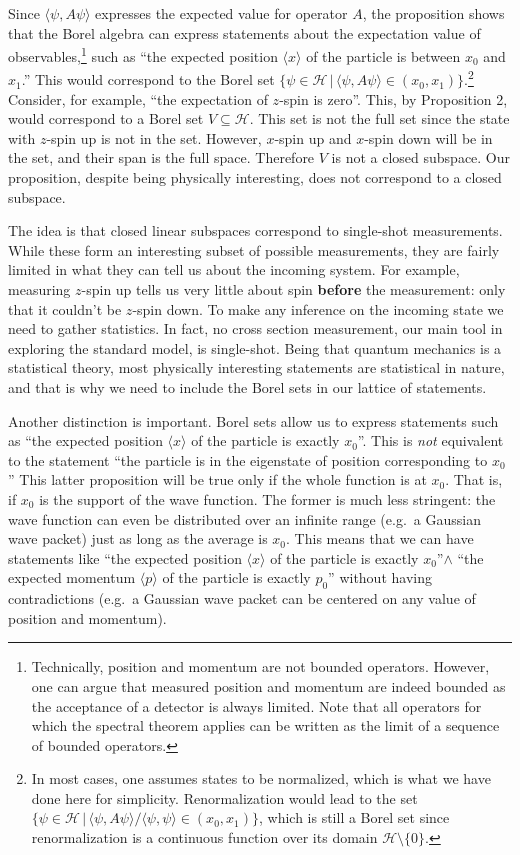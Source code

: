 \documentclass[11pt, executivepaper]{article}
\begin{document}
Since $\langle \psi , A \psi \rangle$ expresses the expected value for operator $A$, the proposition shows that the Borel algebra can express statements about the expectation value of observables,\footnote{Technically, position and momentum are not bounded operators. However, one can argue that measured position and momentum are indeed bounded as the acceptance of a detector is always limited. Note that all operators for which the spectral theorem applies can be written as the limit of a sequence of bounded operators.} such as ``the expected position $\langle x \rangle$ of the particle is between $x_0$ and $x_1$.'' This would correspond to the Borel set $\{ \psi \in \mathcal{H} \, | \, \langle \psi , A \psi \rangle \in (x_0, x_1) \}$.\footnote{In most cases, one assumes states to be normalized, which is what we have done here for simplicity. Renormalization would lead to the set $\{ \psi \in \mathcal{H} \, | \, \langle \psi , A \psi \rangle / \langle \psi , \psi \rangle \in (x_0, x_1) \}$, which is still a Borel set since renormalization is a continuous function over its domain $\mathcal{H} \setminus \{ 0 \}$.} Consider, for example, ``the expectation of $z$-spin is zero''. This, by Proposition 2, would correspond to a Borel set $V \subseteq \mathcal{H}$. This set is not the full set since the state with $z$-spin up is not in the set. However, $x$-spin up and $x$-spin down will be in the set, and their span is the full space. Therefore $V$ is not a closed subspace. Our proposition, despite being physically interesting, does not correspond to a closed subspace.

The idea is that closed linear subspaces correspond to single-shot measurements. While these form an interesting subset of possible measurements, they are fairly limited in what they can tell us about the incoming system. For example, measuring $z$-spin up tells us very little about spin \textbf{before} the measurement: only that it couldn't be $z$-spin down. To make any inference on the incoming state we need to gather statistics. In fact, no cross section measurement, our main tool in exploring the standard model, is single-shot. Being that quantum mechanics is a statistical theory, most physically interesting statements are statistical in nature, and that is why we need to include the Borel sets in our lattice of statements.

Another distinction is important. Borel sets allow us to express statements such as ``the expected position $\langle x \rangle$ of the particle is exactly $x_0$''. This is \emph{not} equivalent to the statement ``the particle is in the eigenstate of position corresponding to $x_0$'' This latter proposition will be true only if the whole function is at $x_0$. That is, if $x_0$ is the support of the wave function. The former is much less stringent: the wave function can even be distributed over an infinite range (e.g.\ a Gaussian wave packet) just as long as the average is $x_0$. This means that we can have statements like ``the expected position $\langle x \rangle$ of the particle is exactly $x_0$''$\wedge$ ``the expected momentum $\langle p \rangle$ of the particle is exactly $p_0$'' without having contradictions (e.g.\ a Gaussian wave packet can be centered on any value of position and momentum).
\end{document}

